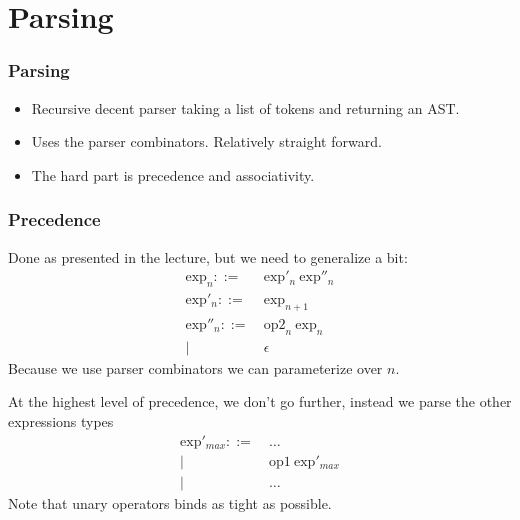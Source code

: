 \documentclass{beamer}
\begin{document}
\section{Parsing}
\begin{frame}
\frametitle{Parsing}
\begin{itemize}
\item Recursive decent parser taking a list of tokens and returning an AST.
\item Uses the parser combinators. Relatively straight forward.
\item The hard part is precedence and associativity.
\end{itemize}
\end{frame}

\begin{frame}
\frametitle{Precedence}
Done as presented in the lecture, but we need to generalize a bit:
\begin{align*}
\text{exp}_n ::=&\ \text{exp}'_n\ \text{exp}''_n \\
\text{exp}'_n ::=&\ \text{exp}_{n+1} \\
\text{exp}''_n ::=&\ \text{op2}_n\ \text{exp}_n  \\
    | &\ \epsilon
\end{align*}
Because we use parser combinators we can parameterize over $n$.

At the highest level of precedence, we don't go further, instead we parse the other expressions types
\begin{align*}
\text{exp}'_{max} ::=&\ \ldots \\
    | &\ \text{op1}\ \text{exp}'_{max} \\
    | &\ \ldots
\end{align*}
Note that unary operators binds as tight as possible.
\end{frame}
\end{document}
